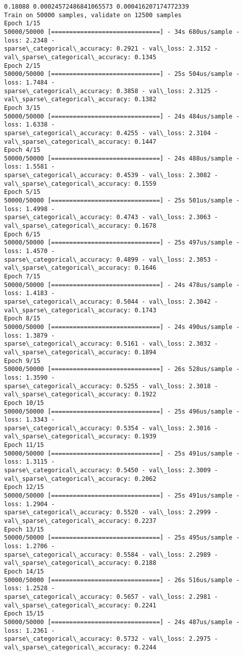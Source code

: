 \documentclass[11pt]{article}
\begin{document}
    \begin{Verbatim}[commandchars=\\\{\}]
0.18088 0.00024572486841065573 0.000416207174772339
Train on 50000 samples, validate on 12500 samples
Epoch 1/15
50000/50000 [==============================] - 34s 680us/sample - loss: 2.2348 -
sparse\_categorical\_accuracy: 0.2921 - val\_loss: 2.3152 -
val\_sparse\_categorical\_accuracy: 0.1345
Epoch 2/15
50000/50000 [==============================] - 25s 504us/sample - loss: 1.7484 -
sparse\_categorical\_accuracy: 0.3858 - val\_loss: 2.3125 -
val\_sparse\_categorical\_accuracy: 0.1382
Epoch 3/15
50000/50000 [==============================] - 24s 484us/sample - loss: 1.6338 -
sparse\_categorical\_accuracy: 0.4255 - val\_loss: 2.3104 -
val\_sparse\_categorical\_accuracy: 0.1447
Epoch 4/15
50000/50000 [==============================] - 24s 488us/sample - loss: 1.5581 -
sparse\_categorical\_accuracy: 0.4539 - val\_loss: 2.3082 -
val\_sparse\_categorical\_accuracy: 0.1559
Epoch 5/15
50000/50000 [==============================] - 25s 501us/sample - loss: 1.4998 -
sparse\_categorical\_accuracy: 0.4743 - val\_loss: 2.3063 -
val\_sparse\_categorical\_accuracy: 0.1678
Epoch 6/15
50000/50000 [==============================] - 25s 497us/sample - loss: 1.4570 -
sparse\_categorical\_accuracy: 0.4899 - val\_loss: 2.3053 -
val\_sparse\_categorical\_accuracy: 0.1646
Epoch 7/15
50000/50000 [==============================] - 24s 478us/sample - loss: 1.4183 -
sparse\_categorical\_accuracy: 0.5044 - val\_loss: 2.3042 -
val\_sparse\_categorical\_accuracy: 0.1743
Epoch 8/15
50000/50000 [==============================] - 24s 490us/sample - loss: 1.3879 -
sparse\_categorical\_accuracy: 0.5161 - val\_loss: 2.3032 -
val\_sparse\_categorical\_accuracy: 0.1894
Epoch 9/15
50000/50000 [==============================] - 26s 528us/sample - loss: 1.3590 -
sparse\_categorical\_accuracy: 0.5255 - val\_loss: 2.3018 -
val\_sparse\_categorical\_accuracy: 0.1922
Epoch 10/15
50000/50000 [==============================] - 25s 496us/sample - loss: 1.3343 -
sparse\_categorical\_accuracy: 0.5354 - val\_loss: 2.3016 -
val\_sparse\_categorical\_accuracy: 0.1939
Epoch 11/15
50000/50000 [==============================] - 25s 491us/sample - loss: 1.3115 -
sparse\_categorical\_accuracy: 0.5450 - val\_loss: 2.3009 -
val\_sparse\_categorical\_accuracy: 0.2062
Epoch 12/15
50000/50000 [==============================] - 25s 491us/sample - loss: 1.2904 -
sparse\_categorical\_accuracy: 0.5520 - val\_loss: 2.2999 -
val\_sparse\_categorical\_accuracy: 0.2237
Epoch 13/15
50000/50000 [==============================] - 25s 495us/sample - loss: 1.2706 -
sparse\_categorical\_accuracy: 0.5584 - val\_loss: 2.2989 -
val\_sparse\_categorical\_accuracy: 0.2188
Epoch 14/15
50000/50000 [==============================] - 26s 516us/sample - loss: 1.2528 -
sparse\_categorical\_accuracy: 0.5657 - val\_loss: 2.2981 -
val\_sparse\_categorical\_accuracy: 0.2241
Epoch 15/15
50000/50000 [==============================] - 24s 487us/sample - loss: 1.2361 -
sparse\_categorical\_accuracy: 0.5732 - val\_loss: 2.2975 -
val\_sparse\_categorical\_accuracy: 0.2244
    \end{Verbatim}
\end{document}
